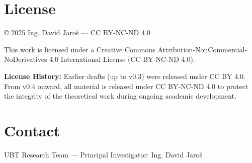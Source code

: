 \documentclass[12pt, a4paper]{article}
\begin{document}
\begin{center}
\end{center}

\vfill

\section*{License}
© 2025 Ing. David Jaroš — CC BY-NC-ND 4.0

This work is licensed under a Creative Commons Attribution-NonCommercial-NoDerivatives 4.0 International License (CC BY-NC-ND 4.0).

\textbf{License History:} Earlier drafts (up to v0.3) were released under CC BY 4.0. From v0.4 onward, all material is released under CC BY-NC-ND 4.0 to protect the integrity of the theoretical work during ongoing academic development.

\section*{Contact}
UBT Research Team — Principal Investigator: Ing. David Jaroš
\end{document}
